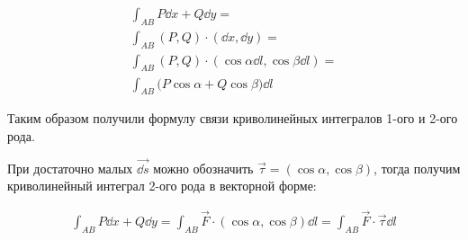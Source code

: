 
\begin{twocolumns}
  
  \columnbreak

  \begin{align*}
    \int_{AB} P \dd x + Q \dd y = \\
    \int_{AB} (P, Q) \cdot (\dd x, \dd y) = \\
    \int_{AB} (P, Q) \cdot (\cos \alpha \dd l, \cos \beta \dd l) = \\
    \int_{AB} \Big( P \cos \alpha + Q \cos \beta \Big) \dd l
  \end{align*}
\end{twocolumns}

Таким образом получили формулу связи криволинейных интегралов 1-ого и 2-ого
рода.

\begin{remark}
  При достаточно малых \(\vec{\dd s}\) можно обозначить
  \(\vec{\tau} = (\cos \alpha, \cos \beta)\),
  тогда получим криволинейный интеграл 2-ого рода в векторной форме:

  \begin{align*}
    \int_{AB} P \dd x + Q \dd y
    = \int_{AB} \vec{F} \cdot (\cos \alpha, \cos \beta) \dd l
    = \int_{AB} \vec{F} \cdot \vec{\tau} \dd l
  \end{align*}
\end{remark}